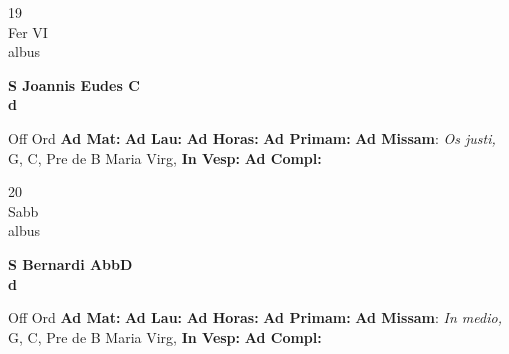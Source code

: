 \documentclass[10pt, openany]{book}
\begin{document}
    \begin{center}
        \begin{minipage}{3.5in}
            \vspace{2em}
            \begin{minipage}{0.5in}
                {\Huge 19} \\
                {\normalsize Fer VI} \\
                {\normalsize albus}
            \end{minipage}
            \begin{minipage}{3.0in}
                \textbf{ \large S Joannis Eudes C \\
                \textnormal{\normalsize d}} \\ 
            \end{minipage}
            \begin{justify}Off Ord
                \textbf{Ad Mat: }
                \textbf{Ad Lau: }
                \textbf{Ad Horas: }
                \textbf{Ad Primam: }\textbf{Ad Missam}: \textit{Os justi,} G, C, Pre de B Maria Virg,  
                \textbf{In Vesp: }
                \textbf{Ad Compl: }
            \end{justify}
        \end{minipage}
    \end{center}

    \begin{center}
        \begin{minipage}{3.5in}
            \vspace{2em}
            \begin{minipage}{0.5in}
                {\Huge 20} \\
                {\normalsize Sabb} \\
                {\normalsize albus}
            \end{minipage}
            \begin{minipage}{3.0in}
                \textbf{ \large S Bernardi AbbD \\
                \textnormal{\normalsize d}} \\ 
            \end{minipage}
            \begin{justify}Off Ord
                \textbf{Ad Mat: }
                \textbf{Ad Lau: }
                \textbf{Ad Horas: }
                \textbf{Ad Primam: }\textbf{Ad Missam}: \textit{In medio,} G, C, Pre de B Maria Virg,  
                \textbf{In Vesp: }
                \textbf{Ad Compl: }
            \end{justify}
        \end{minipage}
    \end{center}
\end{document}
